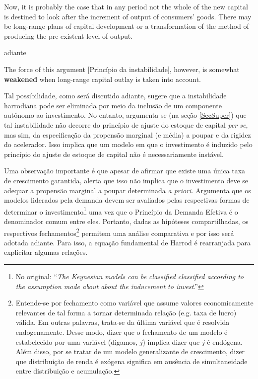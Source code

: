 \begin{citacao}
Now, it is probably the case that in any period not the whole of the new capital is destined to look after the increment of output of consumers' goods. There may be  long-range plans of capital development or a transformation  of the method of  producing  the pre-existent level of output. \cite[p.~17]{harrod_essay_1939}
\end{citacao}
adiante
\begin{citacao}
The force  of this  argument [Princípio da instabilidade], however, is somewhat \textbf{weakened} when long-range  capital outlay is taken into account.
\cite[p.~26, grifos adicionados]{harrod_essay_1939}
\end{citacao}
Tal possibilidade, como será discutido adiante, sugere que a instabilidade harrodiana pode ser eliminada por meio da inclusão de um componente autônomo ao investimento.
No entanto, argumenta-se (na seção \ref{SecSuper}) que tal instabilidade não decorre do princípio de ajuste do estoque de capital \textit{per se}, mas sim, da especificação da propensão marginal (e média) a poupar e da rigidez do acelerador. Isso implica que um modelo em que o investimento é induzido pelo princípio do ajuste de estoque de capital não é necessariamente instável.

Uma observação importante é que apesar de \textcite[p.~23]{harrod_essay_1939} afirmar que existe uma única taxa de crescimento garantida, \textcite[p.~83]{robinson_model_1962} alerta que isso não implica que o investimento %
deve se adequar a propensão marginal a poupar determinada \textit{a priori}. Argumenta que os modelos liderados pela demanda devem ser avaliados pelas respectivas formas de determinar o investimento\footnote{
	No original: ``\textit{The Keynesian models can be classified classified according to the assumption made about about the inducement to invest}.''
} uma vez que o Princípio da Demanda Efetiva é o denominador comum entre eles. Portanto, dadas as hipóteses compartilhadas, os respectivos  fechamentos\footnote{Entende-se por fechamento como variável que assume valores economicamente relevantes de tal forma a tornar determinada relação (e.g. taxa de lucro) válida. Em outras palavras, trata-se da última variável que é resolvida endogenamente. Desse modo, dizer que o fechamento de um modelo é estabelecido por uma variável (digamos, $j$) implica dizer que $j$ é endógena. Além disso, por se tratar de um modelo generalizante de crescimento, dizer que distribuição de renda é exógena significa em ausência de simultaneidade entre distribuição e acumulação.} permitem uma análise comparativa e por isso será adotada adiante. Para isso, a equação fundamental de Harrod é rearranjada para explicitar algumas relações.


